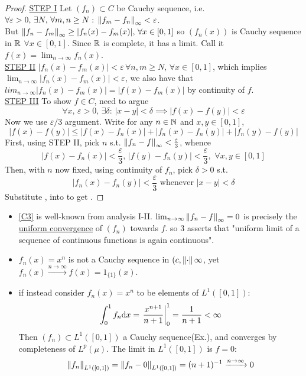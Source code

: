 \documentclass{article}
\begin{document}
\begin{proof}\nl
\underline{STEP I}  Let $(f_n)\subset C$ be Cauchy sequence, i.e. $\forall \varepsilon>0,\,\exists N,\,\forall m,n\geq N:\,\left\|{f_m-f_n}\right\|_\infty<\varepsilon$.\\
But $\left\|{f_n-f_m}\right\|_\infty\geq|f_n(x)-f_m(x)|,\,\forall x\in[0,1]$ so $\left(f_n(x)\right)$ is Cauchy sequence in $\mathbb{R}$ $\forall  x\in[0,1]$. Since $\mathbb{R}$ is complete, it has a limit. Call it $f(x)=\lim_{n\to\infty}f_n(x)$.\\

\underline{STEP II} 
$|f_n(x)-f_m(x)|<\varepsilon\,\forall n,m\geq N,\,\forall x\in[0,1]$, which implies
$\lim_{n\to\infty}|f_n(x)-f_m(x)|<\varepsilon$, we also have that $lim_{n\to\infty}|f_n(x)-f_m(x)|=|f(x)-f_m(x)|$ by continuity of $f$.\\

\underline{STEP III} 
To show $f\in C$, need to argue 
\[
\forall x,\,\varepsilon>0,\,\exists\delta:\,|x-y|<\delta\implies |f(x)-f(y)|<\varepsilon \tag{$C1$}\label{C1}
\]
Now we use $\varepsilon/3$ argument. Write for any $n\in\mathbb{N}$ and $x,y\in[0,1]$,
\[
	|f(x)-f(y)|\leq|f(x)-f_n(x)|+|f_n(x)-f_n(y)|+|f_n(y)-f(y)|\tag{$C2$}\label{C2}
\]
First, using STEP II, pick $n$ s.t. $\left\|{f_n-f}\right\|_\infty<\frac{\varepsilon}{3}$, whence
\[
	|f(x)-f_n(x)|<\frac{\varepsilon}{3},\,|f(y)-f_n(y)|<\frac{\varepsilon}{3},\,\,\forall x,y\in[0,1]\tag{$C3$}\label{C3}
\]
Then, with $n$ now fixed, using continuity of $f_n$, pick $\delta>0$ s.t.
\[
	|f_n(x)-f_n(y)|<\frac{\varepsilon}{3}\text{ whenever } |x-y|<\delta\tag{$C4$}\label{C4}
\]
Substitute , into  to get .

\end{proof}


\begin{remark}
	\begin{itemize}
		\item \cref{C3} is well-known from analysis I-II. $\lim_{n\to\infty}\left\|{f_n-f}\right\|_\infty=0$ is precisely the \underline{uniform convergence} of $(f_n)$ towards $f$. so 3 asserts that "uniform limit of a sequence of continuous functions is again continuous".
		\item $f_n(x)=x^n$ is not a Cauchy sequence in $(c,\left\|{\cdot}\right\|\infty$, yet $f_n(x)\xrightarrow{n\to\infty} f(x)=1_{\{1\}}(x)$.
		\item if instead consider $f_n(x)=x^n$ to be elements of $L^1([0,1])$:
		      $$\int_0^1f_n{\rm d}x=\left.\frac{x^{n+1}}{n+1}\right|^1_0=\frac{1}{n+1}<\infty$$
		      Then $(f_n)\subset L^1([0,1])$ a Cauchy sequence(Ex.), and converges by  completeness of $L^p(\mu)$. The limit in $L^1([0,1])$ is $f=0$:
		      $$\left\|{f_n}\right\|_{L^1([0,1])}=\left\|{f_n-0}\right\|_{L^1([0,1])}=(n+1)^{-1}\xrightarrow{n\to\infty}0$$
	\end{itemize}

\end{remark}
\end{document}
